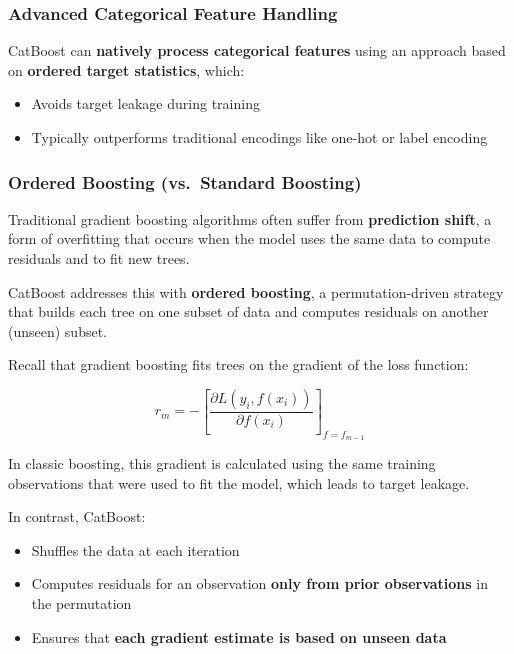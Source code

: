 \documentclass[
  letterpaper,
  DIV=11,
  numbers=noendperiod]{scrreprt}
\providecommand{\tightlist}{%
  \setlength{\itemsep}{0pt}\setlength{\parskip}{0pt}}\usepackage{longtable,booktabs,array}
\begin{document}
\subsubsection{Advanced Categorical Feature
Handling}\label{advanced-categorical-feature-handling}

CatBoost can \textbf{natively process categorical features} using an
approach based on \textbf{ordered target statistics}, which:

\begin{itemize}
\tightlist
\item
  Avoids target leakage during training
\item
  Typically outperforms traditional encodings like one-hot or label
  encoding
\end{itemize}

\subsubsection{Ordered Boosting (vs.~Standard
Boosting)}\label{ordered-boosting-vs.-standard-boosting}

Traditional gradient boosting algorithms often suffer from
\textbf{prediction shift}, a form of overfitting that occurs when the
model uses the same data to compute residuals and to fit new trees.

CatBoost addresses this with \textbf{ordered boosting}, a
permutation-driven strategy that builds each tree on one subset of data
and computes residuals on another (unseen) subset.

Recall that gradient boosting fits trees on the gradient of the loss
function:

\[
r_m = -\left[ \frac{\partial L(y_i, f(x_i))}{\partial f(x_i)} \right]_{f = f_{m-1}}
\]

In classic boosting, this gradient is calculated using the same training
observations that were used to fit the model, which leads to target
leakage.

In contrast, CatBoost:

\begin{itemize}
\tightlist
\item
  Shuffles the data at each iteration
\item
  Computes residuals for an observation \textbf{only from prior
  observations} in the permutation
\item
  Ensures that \textbf{each gradient estimate is based on unseen data}
\end{itemize}
\end{document}
